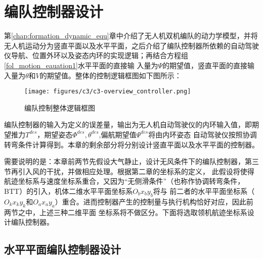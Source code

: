 \chapter{编队控制器设计}
\label{chap:controller_design}
第\ref{chap:formation_dynamic_equ}章中介绍了无人机双机编队的动力学模型，并将无人机运动分为竖直平面以及水平平面，之后介绍了编队控制器所依赖的自动驾驶仪导航、位置外环以及姿态内环的实现逻辑；再结合方程组\ref{fol_motion_eauation1}水平平面的直接输
入量为$\Psi$的期望值，竖直平面的直接输入量为$\theta$和$V$的期望值。整体的控制逻辑框图如下图所示：
\begin{figure}[H]
    \centering
    \texttt{[image: figures/c3/c3-overview\_controller.png]}
    \caption{编队控制整体逻辑框图}\label{fig:c3-overview_controller}
\end{figure}
编队控制器的输入为定义的误差量，输出为无人机自动驾驶仪的内环输入值，即期望推力$T^{des}$，期望姿态$\Phi^{des},\theta^{des}$,偏航期望值$\Psi^{des}$将由内环姿态
自动驾驶仪按照协调转弯条件计算得到。本章的剩余部分将分别设计竖直平面以及水平平面的控制器。

需要说明的是：本章前两节先假设大气静止，设计无风条件下的编队控制器，第三节再引入风的干扰，并做相应处理。根据第二章的坐标系的定义，
此假设将使得航迹坐标系与速度坐标系重合，又因为“无侧滑条件”（也称作协调转弯条件，BTT）的引入，机体二维水平平面坐标系$O_bx_by_b$将与
前二者的水平平面坐标系（$O_kx_ky_k$和$O_ax_ay_a$）重合。进而控制器产生的控制量与执行机构恰好对应，因此前两节之中，上述三种二维平面
坐标系将不做区分。下面将选取领机航迹坐标系设计编队控制器。
\section{水平平面编队控制器设计}
